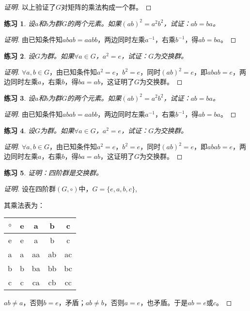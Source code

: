 \documentclass{article}
\newtheorem{Exercise}{练习}
\begin{document}
\begin{CJK*}{UTF8}{gbsn}
\begin{proof}[证明]
     以上验证了$G$对矩阵的乘法构成一个群。
    
  \end{proof}
  \begin{Exercise}
    设$a$和$b$为群$G$的两个元素。如果$(ab)^2=a^2b^2$，试证：$ab=ba$。
  \end{Exercise}
  \begin{proof}[证明]
    由已知条件知$abab=aabb$，两边同时左乘$a^{-1}$，右乘$b^{-1}$，得$ab=ba$。
  \end{proof}
  \begin{Exercise}
    设$G$为群。如果$\forall a\in G$，$a^2=e$，试证：$G$为交换群。
  \end{Exercise}
  \begin{proof}[证明]
    $\forall a,b\in G$，由已知条件知$a^2=e$，$b^2=e$，同时$(ab)^2=e$，即$abab=e$，两边同时左乘$a$，右乘$b$，得$ba=ab$，这证明了$G$为交换群。
  \end{proof}

\begin{Exercise}
  设$a$和$b$为群$G$的两个元素。如果$(ab)^2=a^2b^2$，试证：$ab=ba$。
\end{Exercise}
\begin{proof}[证明]
  由已知条件知$abab=aabb$，两边同时左乘$a^{-1}$，右乘$b^{-1}$，得$ab=ba$。
\end{proof}
\begin{Exercise}
  设$G$为群。如果$\forall a\in G$，$a^2=e$，试证：$G$为交换群。
\end{Exercise}
\begin{proof}[证明]
  $\forall a,b\in G$，由已知条件知$a^2=e$，$b^2=e$，同时$(ab)^2=e$，即$abab=e$，两边同时左乘$a$，右乘$b$，得$ba=ab$，这证明了$G$为交换群。
\end{proof}
\begin{Exercise}
  证明：四阶群是交换群。
\end{Exercise}
\begin{proof}[证明]
  设在四阶群$(G,\circ)$中，$G=\{e,a,b,c\}$,

  其乘法表为：

\begin{tabular}{c|cccc}
  $\circ$&e&a&b&c\\
  \hline
e&e&a&b&c\\
a&a&aa&ab&ac\\
b&b&ba&bb&bc\\
c&c&ca&cb&cc\\
\end{tabular}

$ab\neq a$，否则$b=e$，矛盾；$ab\neq b$，否则$a=e$，也矛盾。于是$ab=e$或$c$。


\end{proof}
\end{CJK*}
\end{document}
